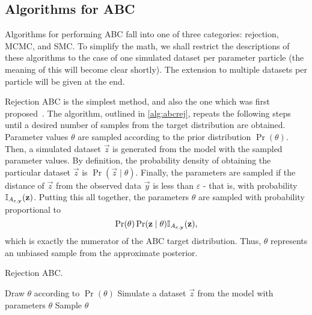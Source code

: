 \subsection{Algorithms for ABC}
\label{subsec:abcalg}

Algorithms for performing \gls{ABC} fall into one of three categories:
rejection, \gls{MCMC}, and \gls{SMC}. To simplify the math, we shall restrict
the descriptions of these algorithms to the case of one simulated dataset per
parameter particle (the meaning of this will become clear shortly). The
extension to multiple datasets per particle will be given at the end.

Rejection ABC is the simplest method, and also the one which was first
proposed~\autocite{rubin1984bayesianly, tavare1997inferring}. The algorithm,
outlined in \cref{alg:abcrej}, repeats the following steps until a desired
number of samples from the target distribution are obtained. Parameter values
$\theta$ are sampled according to the prior distribution $\Pr(\theta)$. Then, a
simulated dataset $\vec{z}$ is generated from the model with the sampled
parameter values. By definition, the probability density of obtaining the
particular dataset $\vec{z}$ is $\Pr(\vec{z} \mid \theta)$. Finally, the
parameters are sampled if the distance of $\vec{z}$ from the observed data
$\vec{y}$ is less than $\varepsilon$ - that is, with probability
$\mathbb{I}_{A_{\varepsilon, \mathbf{y}}}(\mathbf{z})$. Putting this all together, the
parameters $\theta$ are sampled with probability proportional to
\[
  \Pr(\theta) \Pr(\mathbf{z} \mid \theta) \mathbb{I}_{A_{\varepsilon, \mathbf{y}}}(\mathbf{z}),
\]
which is exactly the numerator of the \gls{ABC} target distribution. Thus,
$\theta$ represents an unbiased sample from the approximate posterior.

\begin{algorithm}
  \caption{Rejection \gls{ABC}.}
  \begin{algorithmic}
    \Loop
      \State Draw $\theta$ according to $\Pr(\theta)$
      \State Simulate a dataset $\vec{z}$ from the model with parameters $\theta$
        \State Sample $\theta$
      \EndIf
    \EndLoop
  \end{algorithmic}
  \label{alg:abcrej}
\end{algorithm}

